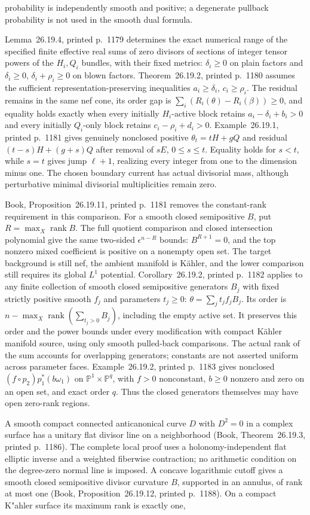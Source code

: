 \documentclass[11pt]{article}
\begin{document}
probability is independently smooth and positive; a degenerate pullback probability is not used in the smooth dual formula.\par Lemma~26.19.4, printed p.~1179 determines the exact numerical range of the specified finite effective real sums of zero divisors of sections of integer tensor powers of the $H_i,Q_i$ bundles, with their fixed metrics: $\delta_i\geq0$ on plain factors and $\delta_i\geq0$, $\delta_i+\rho_i\geq0$ on blown factors. Theorem~26.19.2, printed p.~1180 assumes the sufficient representation-preserving inequalities $a_i\geq\delta_i$, $c_i\geq\rho_i$. The residual remains in the same nef cone, its order gap is $\sum_i(R_i(\theta)-R_i(\beta))\geq0$, and equality holds exactly when every initially $H_i$-active block retains $a_i-\delta_i+b_i>0$ and every initially $Q_i$-only block retains $c_i-\rho_i+d_i>0$. Example~26.19.1, printed p.~1181 gives genuinely nonclosed positive $\theta_t=tH+gQ$ and residual $(t-s)H+(g+s)Q$ after removal of $sE$, $0\leq s\leq t$. Equality holds for $s<t$, while $s=t$ gives jump $\ell+1$, realizing every integer from one to the dimension minus one. The chosen boundary current has actual divisorial mass, although perturbative minimal divisorial multiplicities remain zero.\par Book, Proposition~26.19.11, printed p.~1181 removes the constant-rank requirement in this comparison. For a smooth closed semipositive $B$, put $R=\max_X\operatorname{rank}B$. The full quotient comparison and closed intersection polynomial give the same two-sided $\epsilon^{n-R}$ bounds: $B^{R+1}=0$, and the top nonzero mixed coefficient is positive on a nonempty open set. The target background is still nef, the ambient manifold is K\"ahler, and the lower comparison still requires its global $L^1$ potential. Corollary~26.19.2, printed p.~1182 applies to any finite collection of smooth closed semipositive generators $B_j$ with fixed strictly positive smooth $f_j$ and parameters $t_j\geq0$: $\theta=\sum_jt_jf_jB_j$. Its order is $n-\max_X\operatorname{rank}(\sum_{t_j>0}B_j)$, including the empty active set. It preserves this order and the power bounds under every modification with compact K\"ahler manifold source, using only smooth pulled-back comparisons. The actual rank of the sum accounts for overlapping generators; constants are not asserted uniform across parameter faces. Example~26.19.2, printed p.~1183 gives nonclosed $(f\circ p_2)p_1^*(b\omega_1)$ on $\mathbb P^1\times\mathbb P^q$, with $f>0$ nonconstant, $b\geq0$ nonzero and zero on an open set, and exact order $q$. Thus the closed generators themselves may have open zero-rank regions.\par A smooth compact connected anticanonical curve $D$ with $D^2=0$ in a complex surface has a unitary flat divisor line on a neighborhood (Book, Theorem~26.19.3, printed p.~1186). The complete local proof uses a holonomy-independent flat elliptic inverse and a weighted fiberwise contraction; no arithmetic condition on the degree-zero normal line is imposed. A concave logarithmic cutoff gives a smooth closed semipositive divisor curvature $B$, supported in an annulus, of rank at most one (Book, Proposition~26.19.12, printed p.~1188). On a compact K"ahler surface its maximum rank is exactly one, 
\end{document}
